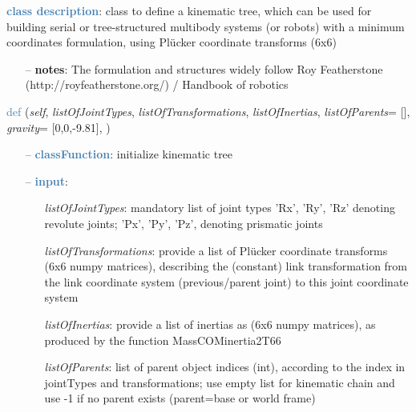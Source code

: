 \begin{itemize}[leftmargin=1.4cm]
\begin{itemize}[leftmargin=0.5cm]
\begin{itemize}[leftmargin=1.4cm]
\begin{itemize}[leftmargin=0.5cm]
\begin{itemize}[leftmargin=1.4cm]
\begin{itemize}[leftmargin=0.5cm]
\begin{itemize}[leftmargin=1.4cm]
\begin{itemize}[leftmargin=1.4cm]
\begin{itemize}[leftmargin=1.4cm]
%
\noindent\textcolor{steelblue}{{\bf class description}}:  class to define a kinematic tree, which can be used for building serial or tree-structured multibody systems
         (or robots) with a minimum coordinates formulation, using Pl\"ucker coordinate transforms (6x6)
\setlength{\itemindent}{0.7cm}
\begin{itemize}[leftmargin=0.7cm]
  \item[--]  {\bf notes}: The formulation and structures widely follow Roy Featherstone (http://royfeatherstone.org/) / Handbook of robotics \cite{Siciliano2016}\vspace{24pt}\end{itemize}
%
\begin{flushleft}
\noindent \textcolor{steelblue}{def {\bf {}}}\label{sec:kinematicTree:KinematicTree66:__init__}
({\it self}, {\it listOfJointTypes}, {\it listOfTransformations}, {\it listOfInertias}, {\it listOfParents}= [], {\it gravity}= [0,0,-9.81], {\it })
\end{flushleft}
\setlength{\itemindent}{0.7cm}
\begin{itemize}[leftmargin=0.7cm]
  \item[--]  \textcolor{steelblue}{\bf classFunction}: initialize kinematic tree  \item[--]  \textcolor{steelblue}{\bf input}: \vspace{-6pt}
  \begin{itemize}[leftmargin=1.2cm]
\setlength{\itemindent}{-0.7cm}
    \item[] {\it listOfJointTypes}: mandatory list of joint types 'Rx', 'Ry', 'Rz' denoting revolute joints; 'Px', 'Py', 'Pz', denoting prismatic joints
    \item[] {\it   listOfTransformations}: provide a list of Pl\"ucker coordinate transforms (6x6 numpy matrices), describing the (constant) link transformation from the link coordinate system (previous/parent joint) to this joint coordinate system
    \item[] {\it   listOfInertias}: provide a list of inertias as (6x6 numpy matrices), as produced by the function MassCOMinertia2T66
    \item[] {\it   listOfParents}: list of parent object indices (int), according to the index in jointTypes and transformations; use empty list for kinematic chain and use -1 if no parent exists (parent=base or world frame)

\end{itemize}
\end{itemize}
\end{itemize}
\end{itemize}
\end{itemize}
\end{itemize}
\end{itemize}
\end{itemize}
\end{itemize}
\end{itemize}
\end{itemize}

